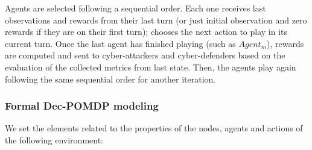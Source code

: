 \noindent
Agents are selected following a sequential order. Each one receives last observations and rewards from their last turn (or just initial observation and zero rewards if they are on their first turn); chooses the next action to play in its current turn. Once the last agent has finished playing (such as $Agent_m$), rewards are computed and sent to cyber-attackers and cyber-defenders based on the evaluation of the collected metrics from last state. Then, the agents play again following the same sequential order for another iteration.


\subsubsection{Formal Dec-POMDP modeling}

We set the elements related to the properties of the nodes, agents and actions of the following environment:

